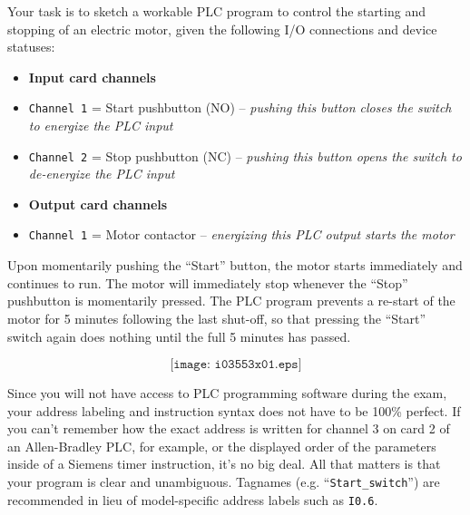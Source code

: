 

Your task is to sketch a workable PLC program to control the starting and stopping of an electric motor, given the following I/O connections and device statuses:

\begin{itemize}
\item{} {\bf Input card channels} 
\item{} {\tt Channel 1} = Start pushbutton (NO) -- {\it pushing this button closes the switch to energize the PLC input}
\item{} {\tt Channel 2} = Stop pushbutton (NC) -- {\it pushing this button opens the switch to de-energize the PLC input}
\end{itemize}

\begin{itemize}
\item{} {\bf Output card channels} 
\item{} {\tt Channel 1} = Motor contactor -- {\it energizing this PLC output starts the motor}
\end{itemize}

\vskip 10pt

Upon momentarily pushing the ``Start'' button, the motor starts immediately and continues to run.  The motor will immediately stop whenever the ``Stop'' pushbutton is momentarily pressed.  The PLC program prevents a re-start of the motor for 5 minutes following the last shut-off, so that pressing the ``Start'' switch again does nothing until the full 5 minutes has passed.

$$\texttt{[image: i03553x01.eps]}$$

Since you will not have access to PLC programming software during the exam, your address labeling and instruction syntax does not have to be 100\% perfect.  If you can't remember how the exact address is written for channel 3 on card 2 of an Allen-Bradley PLC, for example, or the displayed order of the parameters inside of a Siemens timer instruction, it's no big deal.  All that matters is that your program is clear and unambiguous.  Tagnames (e.g. ``{\tt Start\_switch}'') are recommended in lieu of model-specific address labels such as {\tt I0.6}.






